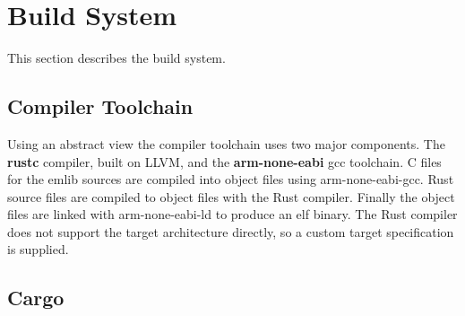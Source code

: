 \section{Build System}
\label{sec:back:build}

This section describes the build system.

\subsection{Compiler Toolchain}
\label{sec:back:build:toolchain}

Using an abstract view the compiler toolchain uses two major components.
The \textbf{rustc} compiler, built on LLVM, and the \textbf{arm-none-eabi} gcc toolchain.
C files for the emlib sources are compiled into object files using arm-none-eabi-gcc.
Rust source files are compiled to object files with the Rust compiler.
Finally the object files are linked with arm-none-eabi-ld to produce an elf binary.
The Rust compiler does not support the target architecture directly, so a custom target specification is supplied.

\subsection{Cargo}
\label{sec:back:build:cargo}

